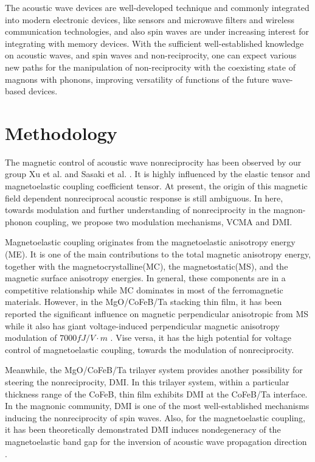 The acoustic wave devices are well-developed technique and commonly integrated into modern electronic devices, like sensors and microwave filters and wireless communication technologies, and also spin waves are under increasing interest for integrating with memory devices. With the sufficient well-established knowledge on acoustic waves, and spin waves and non-reciprocity, one can expect various new paths for the manipulation of non-reciprocity with the coexisting state of magnons with phonons, improving versatility of functions of the future wave-based devices.




\section*{Methodology}

The magnetic control of acoustic wave nonreciprocity has been observed by our group Xu et al. and Sasaki et al. \cite{SasakiNRMS2017,XuIEEMS2018}. It is highly influenced by the elastic tensor and magnetoelastic coupling coefficient tensor. At present, the origin of this magnetic field dependent nonreciprocal acoustic response is still ambiguous. In here, towards modulation and further understanding of nonreciprocity in the magnon-phonon coupling, we propose two modulation mechanisms, VCMA and DMI.             

Magnetoelastic coupling originates from the magnetoelastic anisotropy energy (ME). It is one of the main contributions to the total magnetic anisotropy energy, together with the magnetocrystalline(MC), the magnetostatic(MS), and the magnetic surface anisotropy energies. In general, these components are in a competitive relationship while MC dominates in most of the ferromagnetic materials. However, in the MgO/CoFeB/Ta stacking thin film, it has been reported the significant influence on magnetic perpendicular anisotropic from MS  \cite{GowthamPMA2016} while it also has giant voltage-induced perpendicular magnetic anisotropy modulation of $7000 fJ/V\cdot m$ \cite{YuPMA2015}. Vise versa, it has the high potential for voltage control of magnetoelastic coupling, towards the modulation of nonreciprocity.

Meanwhile, the MgO/CoFeB/Ta trilayer system provides another possibility for steering the nonreciprocity, DMI. In this trilayer system, within a particular thickness range of the CoFeB, thin film exhibits DMI at the CoFeB/Ta interface. In the magnonic community, DMI is one of the most well-established mechanisms inducing the nonreciprocity of spin waves. Also, for the magnetoelastic coupling, it has been theoretically demonstrated DMI induces nondegeneracy of the magnetoelastic band gap for the inversion of acoustic wave propagation direction \cite{VerbaNRMSDMI2018}.

